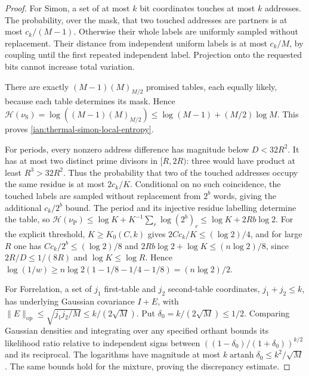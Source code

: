 \begin{proof}
For Simon, a set of at most \(k\) bit coordinates touches at most \(k\)
addresses. The probability, over the mask, that two touched addresses
are partners is at most \(c_k/(M-1)\). Otherwise their whole labels
are uniformly sampled without replacement. Their distance from
independent uniform labels is at most \(c_k/M\), by coupling until
the first repeated independent label. Projection onto the requested
bits cannot increase total variation.

There are exactly \((M-1)(M)_{M/2}\) promised tables, each equally
likely, because each table determines its mask. Hence
\(\mathcal H(\nu_{\mathrm S})
=\log((M-1)(M)_{M/2})\le\log(M-1)+(M/2)\log M\).
This proves \eqref{ian:thermal-simon-local-entropy}.

For periods, every nonzero address difference has magnitude below
\(D<32R^2\). It has at most two distinct prime divisors in
\([R,2R)\): three would have product at least \(R^3>32R^2\).
Thus the probability that two of the touched addresses occupy the
same residue is at most \(2c_k/K\). Conditional on no such coincidence,
the touched labels are sampled without replacement from \(2^b\) words,
giving the additional \(c_k/2^b\) bound.
The period and its injective residue labelling determine the table,
so
\(\mathcal H(\nu_{\mathrm P})
\le\log K+K^{-1}\sum_r\log(2^b)_r
\le\log K+2Rb\log2\).
For the explicit threshold, \(K\ge K_0(C,k)\) gives
\(2Cc_k/K\le(\log2)/4\), and for large \(R\) one has
\(Cc_k/2^b\le(\log2)/8\) and \(2Rb\log2+\log K\le(n\log2)/8\), since
\(2R/D\le1/(8R)\) and \(\log K\le\log R\). Hence
\(\log(1/w)\ge n\log2(1-1/8-1/4-1/8)=(n\log2)/2\).

For Forrelation, a set of \(j_1\) first-table and \(j_2\) second-table
coordinates, \(j_1+j_2\le k\), has underlying Gaussian covariance
\(I+E\), with
\(\|E\|_{\mathrm{op}}\le\sqrt{j_1j_2/M}\le k/(2\sqrt M)\).
Put \(\delta_0=k/(2\sqrt M)\le1/2\). Comparing Gaussian densities and
integrating over any specified orthant bounds its likelihood ratio
relative to independent signs between
\(((1-\delta_0)/(1+\delta_0))^{k/2}\) and its reciprocal.
The logarithms have magnitude at most
\(k\operatorname{artanh}\delta_0\le k^2/\sqrt M\).
The same bounds hold for the mixture, proving the discrepancy estimate.


\end{proof}
